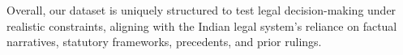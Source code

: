 Overall, our dataset is uniquely structured to test legal decision-making under realistic constraints, aligning with the Indian legal system's reliance on factual narratives, statutory frameworks, precedents, and prior rulings.












